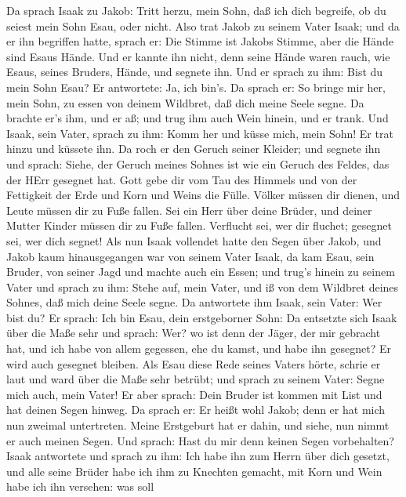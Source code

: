  Da sprach Isaak zu Jakob: Tritt herzu, mein Sohn, daß ich
dich begreife, ob du seiest mein Sohn Esau, oder nicht. 
Also trat Jakob zu seinem Vater Isaak; und da er ihn begriffen hatte,
sprach er: Die Stimme ist Jakobs Stimme, aber die Hände sind Esaus
Hände.  Und er kannte ihn nicht, denn seine Hände waren
rauch, wie Esaus, seines Bruders, Hände, und segnete ihn. 
Und er sprach zu ihm: Bist du mein Sohn Esau? Er antwortete: Ja, ich
bin's.  Da sprach er: So bringe mir her, mein Sohn, zu
essen von deinem Wildbret, daß dich meine Seele segne. Da brachte er's
ihm, und er aß; und trug ihm auch Wein hinein, und er trank.
 Und Isaak, sein Vater, sprach zu ihm: Komm her und küsse
mich, mein Sohn!  Er trat hinzu und küssete ihn. Da roch er
den Geruch seiner Kleider; und segnete ihn und sprach: Siehe, der Geruch
meines Sohnes ist wie ein Geruch des Feldes, das der HErr gesegnet hat.
 Gott gebe dir vom Tau des Himmels und von der Fettigkeit
der Erde und Korn und Weins die Fülle.  Völker müssen dir
dienen, und Leute müssen dir zu Fuße fallen. Sei ein Herr über deine
Brüder, und deiner Mutter Kinder müssen dir zu Fuße fallen. Verflucht
sei, wer dir fluchet; gesegnet sei, wer dich segnet!  Als
nun Isaak vollendet hatte den Segen über Jakob, und Jakob kaum
hinausgegangen war von seinem Vater Isaak, da kam Esau, sein Bruder, von
seiner Jagd  und machte auch ein Essen; und trug's hinein
zu seinem Vater und sprach zu ihm: Stehe auf, mein Vater, und iß von dem
Wildbret deines Sohnes, daß mich deine Seele segne.  Da
antwortete ihm Isaak, sein Vater: Wer bist du? Er sprach: Ich bin Esau,
dein erstgeborner Sohn:  Da entsetzte sich Isaak über die
Maße sehr und sprach: Wer? wo ist denn der Jäger, der mir gebracht hat,
und ich habe von allem gegessen, ehe du kamst, und habe ihn gesegnet? Er
wird auch gesegnet bleiben.  Als Esau diese Rede seines
Vaters hörte, schrie er laut und ward über die Maße sehr betrübt; und
sprach zu seinem Vater: Segne mich auch, mein Vater!  Er
aber sprach: Dein Bruder ist kommen mit List und hat deinen Segen
hinweg.  Da sprach er: Er heißt wohl Jakob; denn er hat
mich nun zweimal untertreten. Meine Erstgeburt hat er dahin, und siehe,
nun nimmt er auch meinen Segen. Und sprach: Hast du mir denn keinen
Segen vorbehalten?  Isaak antwortete und sprach zu ihm: Ich
habe ihn zum Herrn über dich gesetzt, und alle seine Brüder habe ich ihm
zu Knechten gemacht, mit Korn und Wein habe ich ihn versehen: was soll
